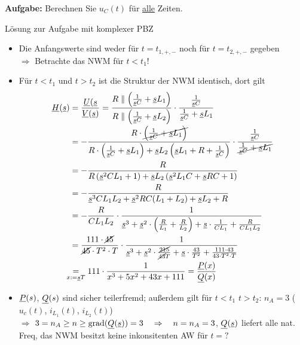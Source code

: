 \textbf{Aufgabe:} Berechnen Sie $u_C(t)$ für \underline{alle} Zeiten.

Lösung zur Aufgabe mit komplexer PBZ

\begin{itemize}
  \item
    Die Anfangswerte sind weder für $t=t_{1,+,-}$ noch für
    $t=t_{2,+,-}$ gegeben\\
    $\Rightarrow$ Betrachte das NWM für $t<t_1$!
  \item
    Für $t<t_1$ und $t>t_2$ ist die Struktur der NWM identisch, dort gilt
    \begin{align*}
      \cn H(\cn s)
        &= \frac{\cn U(\cn s}{\cn V(\cn s)}
         = \frac{%
            R\parallel\left(\frac{1}{\cn sC}+\cn sL_1\right)%
          }{%
            R\parallel\left(\frac{1}{\cn sC}+\cn sL_2\right)
          }
          \cdot\frac{%
            \frac{1}{\cn sC}
          }{%
            \frac{1}{\cn sC}+\cn sL_1
          }\\
        &= -\frac{%
            R\cdot\cancel{\left(\frac{1}{\cn sC}+\cn sL_1\right)}
          }{%
            R\cdot\left(\frac{1}{\cn sC}+\cn sL_1\right)
            +\cn sL_2\left(\cn sL_1+R+\frac{1}{\cn sC}\right)
          }
          \cdot\frac{%
            \frac{1}{\cn sC}
          }{%
            \cancel{\frac{1}{\cn sC}+\cn sL_1}
          }\\
        &= -\frac{%
          R
          }{%
            R\left(\cn s^2CL_1+1\right)+\cn sL_2\left(\cn s^2L_1C+\cn sRC+1\right)
          }\\
        &= -\frac{%
          R
          }{%
            \cn s^3CL_1L_2+\cn s^2RC(L_1+L_2)+\cn sL_2+R
          }\\
        &= -\frac{R}{CL_1L_2}\cdot
          \frac{1}{%
            \cn s^3+\cn s^2\cdot\left(\frac{R}{L_1}+\frac{R}{L_2}\right)
            +\cn s\cdot \frac{1}{CL_1}+\frac{R}{CL_1L_2}
          }\\
        &= \frac{111\cdot \cancel{45}}{\cancel{45}\cdot T^2\cdot T}
          \cdot\frac{1}{%
            \cn s^3+\cn s^2\cdot\frac{\cancel{215}}{\cancel{43}T}+\cn s\cdot\frac{43}{T^2}
            +\frac{111\cdot 43}{43\cdot T^2\cdot T}
          }\\
        &\!\!\!\!\underset{x:=\cn sT}{=} 111\cdot\frac{1}{%
            x^3+5x^2+43x+111
          } = \frac{\cn P(x)}{\cn Q(x)}\\
    \end{align*}

\item $\underline{P}(s)$, $\underline{Q}(s)$ sind sicher teilerfremd; außerdem gilt für $t<t_1$
  $t>t_2$: $n_A=3$ ($u_c(t)$, $i_{L_1}(t)$, $i_{L_2}(t)$)\\
  $\Rightarrow$ $3=n_A\geq n\geq \operatorname{grad}(\underline{Q}(\underline{s}))=3\quad\Rightarrow\quad n=n_A=3$,
  $\underline{Q}(\underline{s})$ liefert alle nat. Freq, das NWM besitzt keine inkonsitenten AW
  für $t=?$


\end{itemize}
